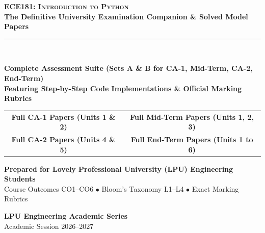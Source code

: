 \begin{titlepage}
\pagecolor{LPUNavy}
\color{white}
\vspace*{1.5cm}

\begin{center}
    {\Huge \bfseries \scshape ECE181: Introduction to Python}\\[5mm]
    {\LARGE \bfseries The Definitive University Examination Companion \& Solved Model Papers}\\[8mm]
    {\color{LPUOrange}\rule{0.8\textwidth}{2pt}}\\[10mm]

    \begin{tcolorbox}[enhanced, width=0.88\textwidth, colback=white, colframe=LPUOrange, boxrule=1.5pt, arc=3mm, halign=center]
        \color{DarkSlate}
        \vspace{2mm}
        {\Large\bfseries Complete Assessment Suite (Sets A \& B for CA-1, Mid-Term, CA-2, End-Term)}\\[3mm]
        {\large\bfseries Featuring Step-by-Step Code Implementations \& Official Marking Rubrics}\\[3mm]
        \begin{tabular}{cc}
            \color{LPUNavy}\textbf{Full CA-1 Papers (Units 1 \& 2)} & \quad \color{LPUNavy}\textbf{Full Mid-Term Papers (Units 1, 2, 3)} \\
            \color{LPUNavy}\textbf{Full CA-2 Papers (Units 4 \& 5)} & \quad \color{LPUNavy}\textbf{Full End-Term Papers (Units 1 to 6)} \\
        \end{tabular}
        \vspace{2mm}
    \end{tcolorbox}

    \vfill

    {\large \bfseries Prepared for Lovely Professional University (LPU) Engineering Students}\\[2mm]
    {\small Course Outcomes CO1--CO6 $\bullet$ Bloom's Taxonomy L1--L4 $\bullet$ Exact Marking Rubrics}\\[10mm]

    \begin{tcolorbox}[width=0.6\textwidth, colback=LPUNavy!80!black, colframe=white, boxrule=0.5pt, halign=center]
        \color{white}
        \textbf{LPU Engineering Academic Series}\\[1mm]
        {\footnotesize Academic Session 2026--2027}
    \end{tcolorbox}
    \vspace*{1cm}
\end{center}
\end{titlepage}
\nopagecolor
\newpage
